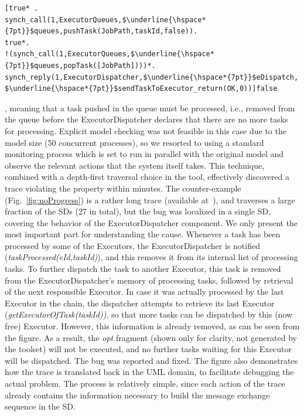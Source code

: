 \documentclass[letter]{llncs}
\begin{document}
\begin{lstlisting}[basicstyle=\sffamily\fontsize{8}{7}\selectfont,showspaces=false,showstringspaces=false,showtabs=false,mathescape]
[true* .
synch_call(1,ExecutorQueues,$\underline{\hspace*{7pt}}$queues,pushTask(JobPath,taskId,false)).
true*.
!(synch_call(1,ExecutorQueues,$\underline{\hspace*{7pt}}$queues,popTask([JobPath])))*.
synch_reply(1,ExecutorDispatcher,$\underline{\hspace*{7pt}}$eDispatch,
$\underline{\hspace*{7pt}}$sendTaskToExecutor_return(OK,0))]false 
\end{lstlisting} 
, meaning that a task pushed in the queue must be processed, i.e., removed from the queue before the ExecutorDispatcher
declares that there are no more tasks for processing.
Explicit model checking was not feasible in this case due to the model size (50 concurrent processes),
so we resorted to using a standard monitoring process which is set to run in parallel with the original model 
and observe the relevant actions that the system itself takes. This technique, combined with a depth-first traversal 
choice in the tool,
effectively discovered
a trace violating the property within minutes. The counter-example (Fig.~\ref{fig:noProgress}) is a rather long trace (available at~\cite{repo:remenska}), 
and traverses a large fraction of the SDs (27 in total), but the bug was localized in a single SD, covering the behavior of 
the ExecutorDispatcher component. 
We only present the most important part for understanding the cause. 
Whenever a task has been processed by some of 
the Executors, the ExecutorDispatcher is notified (\emph{taskProcessed(eId,taskId)}), and this removes it from its internal list 
of processing tasks. To further dispatch the task to another Executor, this task is removed from the ExecutorDispatcher's memory of processing tasks,
followed by retrieval of the next responsible Executor. In case it was actually processed by the last Executor in the chain, the
 dispatcher attempts to retrieve its last Executor (\emph{getExecutorOfTask(taskId))}, so that more tasks can be dispatched by 
this (now free) Executor. However, this information
is already removed, as can be seen from the figure. As a result, the \emph{opt} fragment (shown only for clarity, not generated by the toolset)
will not be executed, and no further tasks waiting for this Executor will be dispatched. The bug was reported and fixed.
The figure also demonstrates how the trace is translated back in the UML domain, 
to facilitate debugging the actual problem. The process is relatively simple, since each action of the trace already 
contains the information necessary 
to build the message exchange sequence in the SD.
\end{document}
